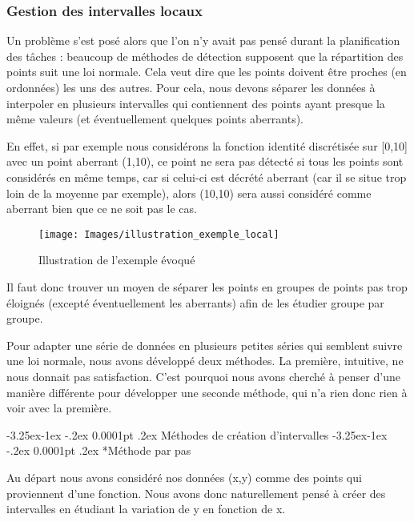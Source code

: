 \documentclass[a4paper,12pt]{article} %
\makeatletter
\renewcommand\paragraph{\@startsection{paragraph}{4}{\z@}%
                                      {-3.25ex\@plus -1ex \@minus -.2ex}%
                                      {0.0001pt \@plus .2ex}%
                                      {\normalfont\normalsize\bfseries}}
\renewcommand\subparagraph{\@startsection{subparagraph}{5}{\z@}%
                                      {-3.25ex\@plus -1ex \@minus -.2ex}%
                                      {0.0001pt \@plus .2ex}%
                                      {\normalfont\normalsize\bfseries}}
\makeatother
\begin{document}
		    \subsubsection{Gestion des intervalles locaux}  
    			Un problème s'est posé alors que l'on n'y avait pas pensé durant la planification des tâches : beaucoup de méthodes de détection supposent que la répartition des points suit une loi normale. Cela veut dire que les points doivent être proches (en ordonnées) les uns des autres. Pour cela, nous devons séparer les données à interpoler en plusieurs intervalles qui contiennent des points ayant presque la même valeurs (et éventuellement quelques points aberrants).
    				
    			En effet, si par exemple nous considérons la fonction identité discrétisée sur [0,10] avec un point aberrant (1,10), ce point ne sera pas détecté si tous les points sont considérés en même temps, car si celui-ci est décrété aberrant (car il se situe trop loin de la moyenne par exemple), alors (10,10) sera aussi considéré comme aberrant bien que ce ne soit pas le cas. 
    				
    			\begin{figure}[H]
                \begin{center}
                \texttt{[image: Images/illustration\_exemple\_local]} 
                \end{center}
                \caption{Illustration de l'exemple évoqué}
                \label{NUL3}
                \end{figure}
    				
    			Il faut donc trouver un moyen de séparer les points en groupes de points pas trop éloignés (excepté éventuellement les aberrants) afin de les étudier groupe par groupe.
    				
    				
			   Pour adapter une série de données en plusieurs petites séries qui semblent suivre une loi normale, nous avons développé deux méthodes. La première, intuitive, ne nous donnait pas satisfaction. C'est pourquoi nous avons cherché à penser d'une manière différente pour développer une seconde méthode, qui n'a rien donc rien à voir avec la première.
		
		
			    \paragraph{Méthodes de création d'intervalles}
		            \subparagraph*{Méthode par pas}
			    
    			        Au départ nous avons considéré nos données (x,y) comme des points qui proviennent d'une fonction. Nous avons donc naturellement pensé à créer des intervalles en étudiant la variation de y en fonction de x.\\
    				    
\end{document}
